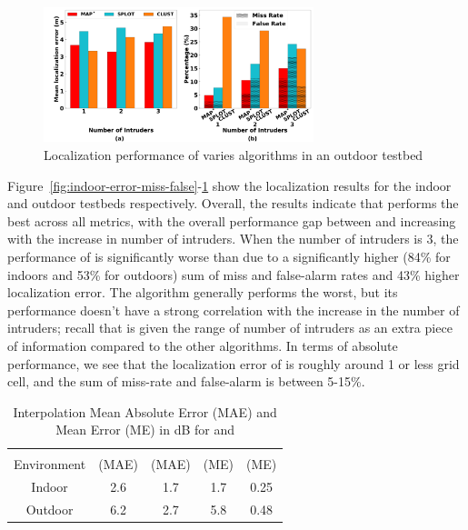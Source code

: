 \begin{figure}
	\centering
	\includegraphics[width=0.7\textwidth]{chapters/ipsn/figures/outdoor-error-missfalse.png}
	\caption{Localization performance of varies algorithms in an outdoor testbed}
	\label{fig:outdoor-error-miss-false}
\end{figure}

Figure~\ref{fig:indoor-error-miss-false}-\ref{fig:outdoor-error-miss-false}
show the localization results for the indoor and outdoor testbeds
respectively. Overall, the results indicate that \ouralgo performs the
best across all metrics, with the overall performance gap between
\ouralgo and \splot increasing with the increase in number of
intruders. When the number of intruders is 3, the performance of
\splot is significantly worse than \ouralgo due to a
significantly higher (84\% for indoors and 53\% for outdoors) sum of miss and false-alarm rates and 43\% higher localization error.
The \cl algorithm generally performs the worst, but its
performance doesn't have a strong correlation with the increase in the
number of intruders; recall that \cl is given the range of number of
intruders as an extra piece of information compared to the other
algorithms.  In terms of absolute performance, we see that the
localization error of \ouralgo is roughly around 1 or less grid cell,
and the sum of miss-rate and false-alarm is between 5-15\%.

\begin{table}[h]
	\centering
	\caption{Interpolation Mean Absolute Error (MAE) and  Mean Error (ME) in dB for \idw and \ildw}
	\begin{tabular}{c | c c c c}
		\hline\hline
		& \idw & \ildw &  \idw & \ildw \\ 
		Environment & (MAE) & (MAE)  & (ME) &  (ME) \\
		\hline 
		Indoor &  2.6 & 1.7  &  1.7 & 0.25  \\
		Outdoor & 6.2 & 2.7 & 5.8 & 0.48  \\
		\hline %
	\end{tabular}
	\label{tab:inter-error}	
\end{table}

